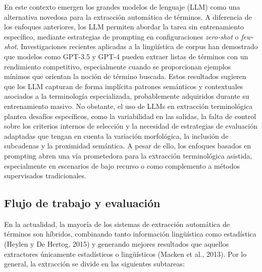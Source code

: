 En este contexto emergen los grandes modelos de lenguaje (LLM) como una alternativa novedosa para la extracción automática de términos. A diferencia de los enfoques anteriores, los LLM permiten abordar la tarea sin entrenamiento específico, mediante estrategias de prompting en configuraciones \textit{zero-shot} o \textit{few-shot}. Investigaciones recientes aplicadas a la lingüística de corpus han demostrado que modelos como GPT-3.5 y GPT-4 pueden extraer listas de términos con un rendimiento competitivo, especialmente cuando se proporcionan ejemplos mínimos que orientan la noción de término buscada. Estos resultados sugieren que los LLM capturan de forma implícita patrones semánticos y contextuales asociados a la terminología especializada, probablemente adquiridos durante su entrenamiento masivo. No obstante, el uso de LLMs en extracción terminológica plantea desafíos específicos, como la variabilidad en las salidas, la falta de control sobre los criterios internos de selección y la necesidad de estrategias de evaluación adaptadas que tengan en cuenta la variación morfológica, la inclusión de subcadenas y la proximidad semántica. A pesar de ello, los enfoques basados en prompting abren una vía prometedora para la extracción terminológica asistida, especialmente en escenarios de bajo recurso o como complemento a métodos supervisados tradicionales.

\subsection{Flujo de trabajo y evaluación}

En la actualidad, la mayoría de los sistemas de extracción automática de términos son híbridos, combinando tanto información lingüística como estadística (Heylen y De Hertog, 2015) y generando mejores resultados que aquellos extractores únicamente estadísticos o lingüísticos (Macken et al., 2013). Por lo general, la extracción se divide en las siguientes subtareas:

